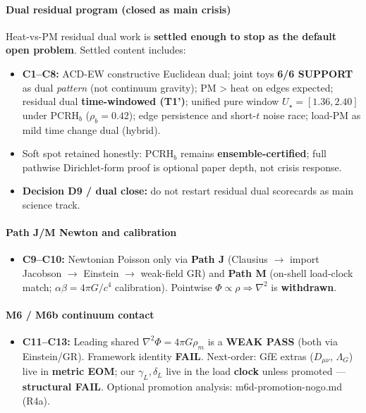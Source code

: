 \documentclass[
  11pt,
]{article}
\providecommand{\tightlist}{%
  \setlength{\itemsep}{0pt}\setlength{\parskip}{0pt}}
\begin{document}
\paragraph{Dual residual program (closed as main crisis)}\label{dual-residual-program-closed-as-main-crisis}

Heat-vs-PM residual dual work is \textbf{settled enough to stop as the default open problem}. Settled content includes:

\begin{itemize}
\tightlist
\item
  \textbf{C1--C8:} ACD-EW constructive Euclidean dual; joint toys \textbf{6/6 SUPPORT} as dual \emph{pattern} (not continuum gravity); PM \textgreater{} heat on edges expected; residual dual \textbf{time-windowed (T1')}; unified pure window \(U_\star=[1.36,2.40]\) under PCRH\(_b\) (\(\rho_b=0.42\)); edge persistence and short-\(t\) noise race; load-PM as mild time change dual (hybrid).
\item
  Soft spot retained honestly: PCRH\(_b\) remains \textbf{ensemble-certified}; full pathwise Dirichlet-form proof is optional paper depth, not crisis response.
\item
  \textbf{Decision D9 / dual close:} do not restart residual dual scorecards as main science track.
\end{itemize}

\paragraph{Path J/M Newton and calibration}\label{path-jm-newton-and-calibration}

\begin{itemize}
\tightlist
\item
  \textbf{C9--C10:} Newtonian Poisson only via \textbf{Path J} (Clausius $\rightarrow$ import Jacobson $\rightarrow$ Einstein $\rightarrow$ weak-field GR) and \textbf{Path M} (on-shell load-clock match; \(\alpha\beta=4\pi G/c^4\) calibration). Pointwise \(\Phi\propto\rho\Rightarrow\nabla^2\) is \textbf{withdrawn}.
\end{itemize}

\paragraph{M6 / M6b continuum contact}\label{m6-m6b-continuum-contact}

\begin{itemize}
\tightlist
\item
  \textbf{C11--C13:} Leading shared \(\nabla^2\Phi=4\pi G\rho_m\) is a \textbf{WEAK PASS} (both via Einstein/GR). Framework identity \textbf{FAIL}. Next-order: GfE extras (\(D_{\mu\nu}\), \(\Lambda_G\)) live in \textbf{metric EOM}; our \(\gamma_L,\delta_L\) live in the load \textbf{clock} unless promoted --- \textbf{structural FAIL}. Optional promotion analysis: m6d-promotion-nogo.md (R4a).
\end{itemize}
\end{document}
